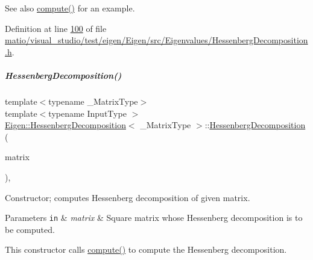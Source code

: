 \begin{DoxySeeAlso}{See also}
\hyperlink{group___eigenvalues___module_a239a6fd42c57aab3c0b048c47fde3004}{compute()} for an example. 
\end{DoxySeeAlso}


Definition at line \hyperlink{matio_2visual__studio_2test_2eigen_2_eigen_2src_2_eigenvalues_2_hessenberg_decomposition_8h_source_l00100}{100} of file \hyperlink{matio_2visual__studio_2test_2eigen_2_eigen_2src_2_eigenvalues_2_hessenberg_decomposition_8h_source}{matio/visual\+\_\+studio/test/eigen/\+Eigen/src/\+Eigenvalues/\+Hessenberg\+Decomposition.\+h}.

\mbox{\label{group___eigenvalues___module_acd22602a3e3e5a02f79990ba1e445dc9}} 
\subparagraph{\texorpdfstring{Hessenberg\+Decomposition()}{HessenbergDecomposition()}\hspace{0.1cm}{\footnotesize\ttfamily [4/4]}}
{\footnotesize\ttfamily template$<$typename \+\_\+\+Matrix\+Type$>$ \\
template$<$typename Input\+Type $>$ \\
\hyperlink{group___eigenvalues___module_class_eigen_1_1_hessenberg_decomposition}{Eigen\+::\+Hessenberg\+Decomposition}$<$ \+\_\+\+Matrix\+Type $>$\+::\hyperlink{group___eigenvalues___module_class_eigen_1_1_hessenberg_decomposition}{Hessenberg\+Decomposition} (\begin{DoxyParamCaption}\item[{const \hyperlink{group___core___module_struct_eigen_1_1_eigen_base}{Eigen\+Base}$<$ Input\+Type $>$ \&}]{matrix }\end{DoxyParamCaption})\hspace{0.3cm}{\ttfamily [inline]}, {\ttfamily [explicit]}}



Constructor; computes Hessenberg decomposition of given matrix. 


\begin{DoxyParams}[1]{Parameters}
\mbox{\tt in}  & {\em matrix} & Square matrix whose Hessenberg decomposition is to be computed.\\
\hline
\end{DoxyParams}
This constructor calls \hyperlink{group___eigenvalues___module_a239a6fd42c57aab3c0b048c47fde3004}{compute()} to compute the Hessenberg decomposition.

